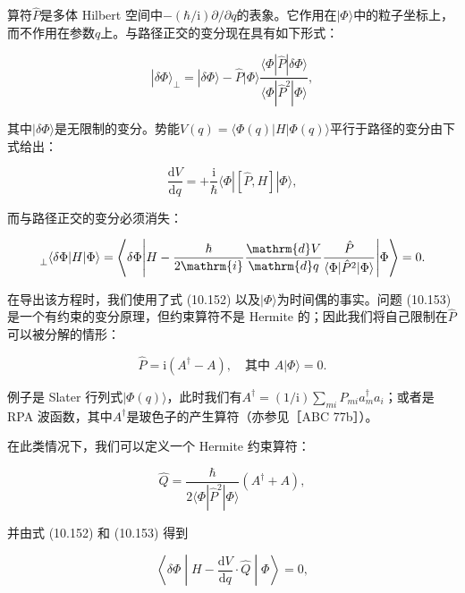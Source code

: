 算符$\hat{P}$是多体 Hilbert 空间中$-(\hbar/\mathrm{i})\partial/\partial q$的表象。它作用在$|\Phi\rangle$中的粒子坐标上，而不作用在参数$q$上。与路径正交的变分现在具有如下形式：

\begin{equation}
|\delta\Phi\rangle_{\perp}=|\delta\Phi\rangle-\hat{P}|\Phi\rangle\frac{\langle\Phi|\hat{P}|\delta\Phi\rangle}{\langle\Phi|\hat{P}^{2}|\Phi\rangle},\label{eq:10.151}
\end{equation}

其中$|\delta\Phi\rangle$是无限制的变分。势能$V(q)=\langle\Phi(q)|H|\Phi(q)\rangle$平行于路径的变分由下式给出：

\begin{equation}
\frac{\mathrm{d}V}{\mathrm{d}q}=+\frac{\mathrm{i}}{\hbar}\langle\Phi|[\hat{P},H]|\Phi\rangle,\label{eq:10.152}
\end{equation}

而与路径正交的变分必须消失：

\begin{equation}
\prescript{}{\perp}{\langle}\delta\Phi|H|\Phi\rangle=\left\langle \delta\Phi\middle|H-\frac{\hbar}{2\mathrm{i}}\frac{\mathrm{d}V}{\mathrm{d}q}\frac{\hat{P}}{\langle\Phi|\hat{P}^{2}|\Phi\rangle}\middle|\Phi\right\rangle =0.\label{eq:10.153}
\end{equation}

在导出该方程时，我们使用了式 (10.152) 以及$|\Phi\rangle$为时间偶的事实。问题 (10.153) 是一个有约束的变分原理，但约束算符不是
Hermite 的；因此我们将自己限制在$\hat{P}$可以被分解的情形：

\begin{equation}
\hat{P}=\mathrm{i}(A^{\dagger}-A),\quad\text{其中 }A|\Phi\rangle=0.\label{eq:10.154}
\end{equation}

例子是 Slater 行列式$|\Phi(q)\rangle$，此时我们有$A^{\dagger}=(1/\mathrm{i})\sum_{mi}P_{mi}a^{\dagger}_{m}a_{i}$；或者是
RPA 波函数，其中$A^{\dagger}$是玻色子的产生算符（亦参见［ABC 77b］）。

在此类情况下，我们可以定义一个 Hermite 约束算符：

\begin{equation}
\hat{Q}=\frac{\hbar}{2\langle\Phi|\hat{P}^{2}|\Phi\rangle}(A^{\dagger}+A),\label{eq:10.155}
\end{equation}

并由式 (10.152) 和 (10.153) 得到

\begin{equation}
\left\langle \delta\Phi\middle|H-\frac{\mathrm{d}V}{\mathrm{d}q}\cdot\hat{Q}\middle|\Phi\right\rangle =0,\label{eq:10.156}
\end{equation}


